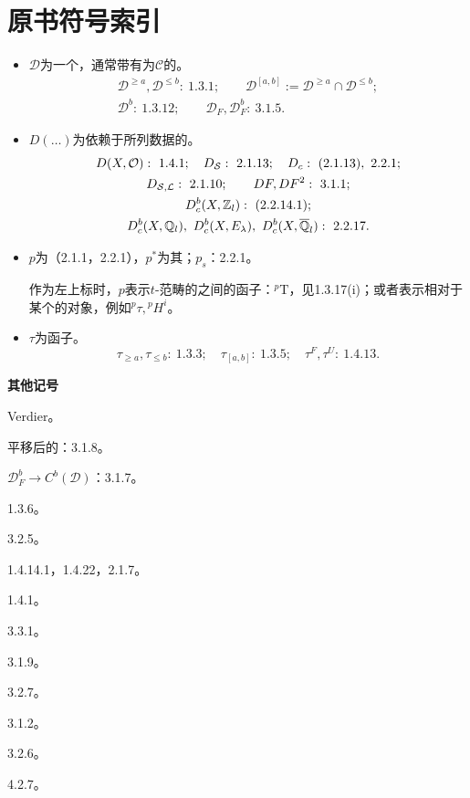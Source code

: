 \chapter*{原书符号索引}
\begin{itemize}
\item $\mathcal D$为一个，通常带有为$\mathcal C$的。
\[
\begin{gathered}
\mathcal D^{\ge a},\mathcal D^{\le b}:\ 1.3.1;\qquad
\mathcal D^{[a,b]}:=\mathcal D^{\ge a}\cap\mathcal D^{\le b};\\
\mathcal D^b:\ 1.3.12;\qquad
\mathcal D_F,\mathcal D_F^b:\ 3.1.5.
\end{gathered}
\]
\item $D(\ldots)$为依赖于所列数据的。
\[
\begin{gathered}
D(X,\mathcal O):\ 1.4.1;\quad
D_{\mathcal S}:\ 2.1.13;\quad
D_c:\ (2.1.13),\ 2.2.1;\\
D_{\mathcal S,\mathcal L}:\ 2.1.10;\qquad DF,DF^2:\ 3.1.1;\\
D_c^b(X,\Z_\ell):\ (2.2.14.1);\\
D_c^b(X,\Q_\ell),\ D_c^b(X,E_\lambda),\ D_c^b(X,\overline{\Q}_\ell):\ 2.2.17.
\end{gathered}
\]
\item $p$为（2.1.1，2.2.1），$p^*$为其；$p_s$：2.2.1。

作为左上标时，$p$表示$t$-范畴的之间的函子：${}^p\mathrm T$，见1.3.17(i)；或者表示相对于某个的对象，例如${}^p\tau,{}^pH^i$。
\item $\tau$为函子。
\[
\tau_{\ge a},\tau_{\le b}:\ 1.3.3;\quad
\tau_{[a,b]}:\ 1.3.5;\quad
\tau^F,\tau^U:\ 1.4.13.
\]
\end{itemize}
\noindent\textbf{其他记号}
\begin{description}[leftmargin=6em,labelwidth=5.5em]
\item[{$\mathrm D$}] Verdier。
\item[{$F[n]$}] 平移后的：3.1.8。
\item[{$G$}] $\mathcal D_F^b\to C^b(\mathcal D)$：3.1.7。
\item[{$H^0$}] 1.3.6。
\item[{$\operatorname{Hom}_\alpha$}] 3.2.5。
\item[{$j_{!*}$}] 1.4.14.1，1.4.22，2.1.7。
\item[{$M(X,\mathcal O)$}] 1.4.1。
\item[{$n,n^*,n^+$}] 3.3.1。
\item[{$\mathrm{r\acute eal}$}] 3.1.9。
\item[{$\operatorname{tot} A$}] 3.2.7。
\item[{$\delta(F,G)$}] 3.1.2。
\item[{$\Delta,\Delta^+$}] 3.2.6。
\item[{$\boxtimes$}] 4.2.7。
\end{description}

